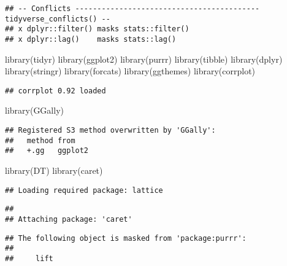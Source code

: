 \documentclass[
]{article}
\newenvironment{Shaded}{\begin{snugshade}}{\end{snugshade}}
\newcommand{\FunctionTok}[1]{\textcolor[rgb]{0.00,0.00,0.00}{#1}}
\newcommand{\NormalTok}[1]{#1}
\begin{document}
\begin{verbatim}
## -- Conflicts ------------------------------------------ tidyverse_conflicts() --
## x dplyr::filter() masks stats::filter()
## x dplyr::lag()    masks stats::lag()
\end{verbatim}

\begin{Shaded}
\begin{Highlighting}[]
\FunctionTok{library}\NormalTok{(tidyr)}
\FunctionTok{library}\NormalTok{(ggplot2)}
\FunctionTok{library}\NormalTok{(purrr)}
\FunctionTok{library}\NormalTok{(tibble)}
\FunctionTok{library}\NormalTok{(dplyr)}
\FunctionTok{library}\NormalTok{(stringr)}
\FunctionTok{library}\NormalTok{(forcats)}
\FunctionTok{library}\NormalTok{(ggthemes)}
\FunctionTok{library}\NormalTok{(corrplot)}
\end{Highlighting}
\end{Shaded}

\begin{verbatim}
## corrplot 0.92 loaded
\end{verbatim}

\begin{Shaded}
\begin{Highlighting}[]
\FunctionTok{library}\NormalTok{(GGally)}
\end{Highlighting}
\end{Shaded}

\begin{verbatim}
## Registered S3 method overwritten by 'GGally':
##   method from   
##   +.gg   ggplot2
\end{verbatim}

\begin{Shaded}
\begin{Highlighting}[]
\FunctionTok{library}\NormalTok{(DT)}
\FunctionTok{library}\NormalTok{(caret)}
\end{Highlighting}
\end{Shaded}

\begin{verbatim}
## Loading required package: lattice
\end{verbatim}

\begin{verbatim}
## 
## Attaching package: 'caret'
\end{verbatim}

\begin{verbatim}
## The following object is masked from 'package:purrr':
## 
##     lift
\end{verbatim}
\end{document}
